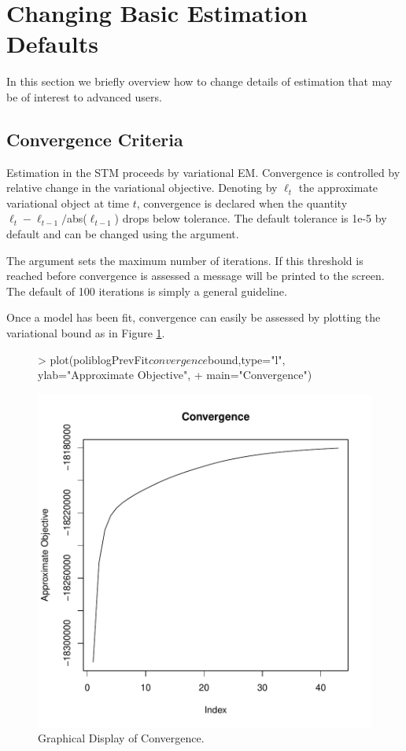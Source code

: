 \documentclass[nojss]{jss}
\begin{document}
\section{Changing Basic Estimation Defaults}
In this section we briefly overview how to change details of estimation that may be of interest to advanced users.

\subsection{Convergence Criteria}
Estimation in the STM proceeds by variational EM.  Convergence is controlled by relative change in the variational objective.  Denoting by $\ell_t$ the approximate variational object at time $t$, convergence is declared when the quantity $\ell_t - \ell_{t-1}/$abs($\ell_{t-1}$) drops below tolerance.  The default tolerance is 1e-5 by default and can be changed using the  argument.

The argument  sets the maximum number of iterations.  If this threshold is reached before convergence is assessed a message will be printed to the screen.  The default of 100 iterations is simply a general guideline.

Once a model has been fit, convergence can easily be assessed by plotting the variational bound as in Figure \ref{fig:converge}. 

\begin{figure}[t!]
\begin{center}
\begin{Schunk}
\begin{Sinput}
> plot(poliblogPrevFit$convergence$bound,type="l", ylab="Approximate Objective",
+     main="Convergence")
\end{Sinput}
\end{Schunk}
\includegraphics{stmVignette-026}
\caption{Graphical Display of Convergence.}
\label{fig:converge}
\end{center}
\end{figure}
\end{document}
